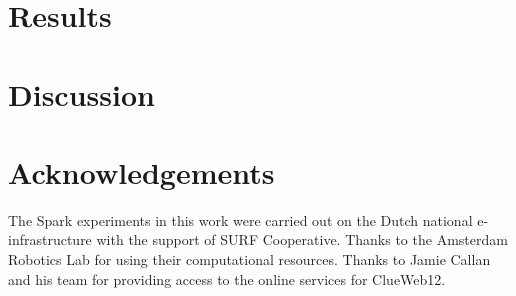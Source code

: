 \section{Results}


\section{Discussion}

\section{Acknowledgements}
The Spark experiments in this work were carried out on the Dutch national e-infrastructure with the support of SURF Cooperative. Thanks to the Amsterdam Robotics Lab for using their computational resources. Thanks to Jamie Callan and his team for providing access to the online services for ClueWeb12. 
